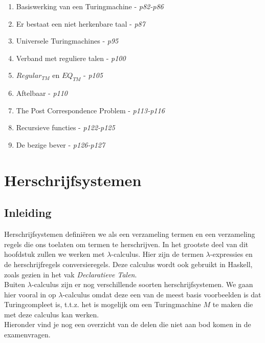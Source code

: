 \documentclass[10pt,a4paper]{article}
\begin{document}
\begin{enumerate}
	\item Basiswerking van een Turingmachine - \emph{p82-p86}
	\item Er bestaat een niet herkenbare taal - \emph{p87}
	\item Universele Turingmachines - \emph{p95}
	\item Verband met reguliere talen - \emph{p100}
	\item $Regular_{TM}$ en $EQ_{TM}$ - \emph{p105}
	\item Aftelbaar - \emph{p110}
	\item The Post Correspondence Problem - \emph{p113-p116}
	\item Recursieve functies - \emph{p122-p125}
	\item De bezige bever - \emph{p126-p127}
\end{enumerate}









\newpage
\section{Herschrijfsystemen}

\subsection{Inleiding}

Herschrijfsystemen defini\"eren we als een verzameling termen en een verzameling regels die ons toelaten om termen te herschrijven. In het grootste deel van dit hoofdstuk zullen we werken met $\lambda$-calculus. Hier zijn de termen $\lambda$-expressies en de herschrijfregels conversieregels. Deze calculus wordt ook gebruikt in Haskell, zoals gezien in het vak \emph{Declaratieve Talen}.\\

Buiten $\lambda$-calculus zijn er nog verschillende soorten herschrijfsystemen. We gaan hier vooral in op $\lambda$-calculus omdat deze een van de meest basis voorbeelden is dat Turingcompleet is, t.t.z. het is mogelijk om een Turingmachine $M$ te maken die met deze calculus kan werken.\\

Hieronder vind je nog een overzicht van de delen die niet aan bod komen in de examenvragen.
\end{document}
